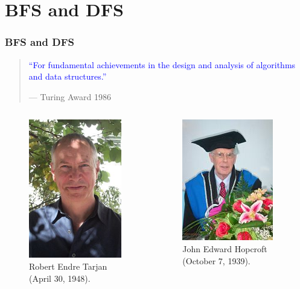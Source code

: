 \section{BFS and DFS}

\begin{frame}
  \frametitle{BFS and DFS}

  \begin{quote}
    \textcolor{blue}{``For fundamental achievements in the design and analysis of algorithms and data structures.''}

    \hfill {--- Turing Award 1986}
  \end{quote}

  \begin{columns}
    \begin{column}{0.50\textwidth}
      \begin{figure}
        \includegraphics[scale=0.30]{figure/bfs_dfs/Tarjan}
        \caption{{\scriptsize Robert Endre Tarjan (April 30, 1948).}}
        \label{fig:Tarjan}
      \end{figure}
    \end{column}

    \begin{column}{0.50\textwidth}
      \begin{figure}
        \includegraphics[scale=0.50]{figure/bfs_dfs/hopcroft}
        \caption{{\scriptsize John Edward Hopcroft (October 7, 1939)}.}
        \label{fig:hopcroft}
      \end{figure}
    \end{column}
  \end{columns}

\end{frame}


